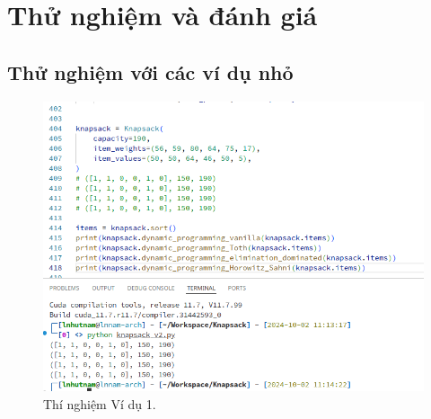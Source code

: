 


\section{Thử nghiệm và đánh giá}


\subsection{Thử nghiệm với các ví dụ nhỏ}


\begin{figure}[H]
    \centering
    \includegraphics[width=1\columnwidth]{figures/vd.png}
    \caption{Thí nghiệm Ví dụ 1.}
    \label{fig:test1}
\end{figure}

